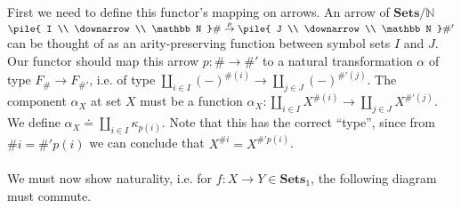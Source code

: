 \documentclass{article}
\newcommand{\mbf}{\mathbf}
\newcommand{\vrt}[2]{
\pile{
#1 \\
\downarrow \\
#2
}
}
\begin{document}
First we need to define this functor's mapping on arrows. An arrow of $\mbf{Sets}/\mathbb N$ 
$\vrt{I}{\mathbb N} \# \overset{p}{\to} \vrt{J}{\mathbb N}\#'$ can be thought of as
an arity-preserving function between symbol sets $I$ and $J$. Our functor should map this arrow $p : \# \to \#'$
to a natural transformation $\alpha$ of type $F_{\#} \to F_{\#'}$, i.e. of type 
$\coprod_{i \in I} (-)^{\#(i)} \to \coprod_{j \in J} (-)^{\#'(j)}$. The component $\alpha_X$ at set $X$ must be a function 
$\alpha_X : \coprod_{i \in I} X^{\#(i)} \to \coprod_{j \in J} X^{\#'(j)}$. We define
$\alpha_X \doteq \coprod_{i \in I} \kappa_{p(i)}$. Note that this has the correct ``type'', since from $\# i = \#'p(i)$
we can conclude that $X^{\# i} = X^{\#' p(i)}$.\\~\\
We must now show naturality, i.e. for $f : X \to Y \in \mbf{Sets}_1$, the following diagram must commute.
\begin{center}
\end{center} 
\end{document}
